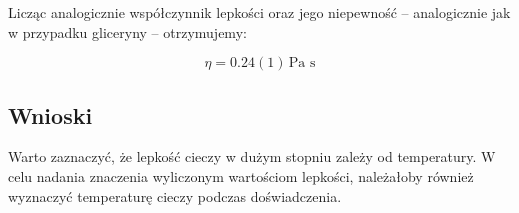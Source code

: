 \documentclass[a4paper]{article}
\newlength{\du}
\begin{document}
Licząc analogicznie współczynnik lepkości oraz jego niepewność -- analogicznie jak w przypadku gliceryny -- otrzymujemy:

$$
\eta = 0.24 (1) \, \text{Pa s}
$$

\subsection{Wnioski}

Warto zaznaczyć, że lepkość cieczy w dużym stopniu zależy od temperatury.
W celu nadania znaczenia wyliczonym wartościom lepkości, należałoby również wyznaczyć temperaturę cieczy podczas doświadczenia.
\end{document}
